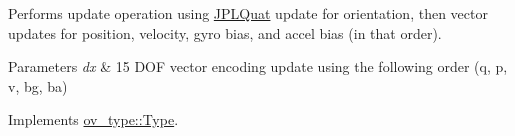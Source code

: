 Performs update operation using \hyperlink{classov__type_1_1JPLQuat}{J\+P\+L\+Quat} update for orientation, then vector updates for position, velocity, gyro bias, and accel bias (in that order). 


\begin{DoxyParams}{Parameters}
{\em dx} & 15 D\+OF vector encoding update using the following order (q, p, v, bg, ba) \\
\hline
\end{DoxyParams}


Implements \hyperlink{classov__type_1_1Type_a4e133d50af35f07bd97f73590fe31000}{ov\+\_\+type\+::\+Type}.

